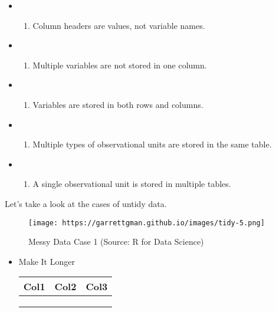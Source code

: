 \documentclass[
]{book}
\providecommand{\tightlist}{%
  \setlength{\itemsep}{0pt}\setlength{\parskip}{0pt}}
\begin{document}
\begin{itemize}
\item
  \begin{enumerate}
  \def\labelenumi{\arabic{enumi}.}
  \tightlist
  \item
    Column headers are values, not variable names.
  \end{enumerate}
\item
  \begin{enumerate}
  \def\labelenumi{\arabic{enumi}.}
  \setcounter{enumi}{1}
  \tightlist
  \item
    Multiple variables are not stored in one column.
  \end{enumerate}
\item
  \begin{enumerate}
  \def\labelenumi{\arabic{enumi}.}
  \setcounter{enumi}{2}
  \tightlist
  \item
    Variables are stored in both rows and columns.
  \end{enumerate}
\item
  \begin{enumerate}
  \def\labelenumi{\arabic{enumi}.}
  \setcounter{enumi}{3}
  \tightlist
  \item
    Multiple types of observational units are stored in the same table.
  \end{enumerate}
\item
  \begin{enumerate}
  \def\labelenumi{\arabic{enumi}.}
  \setcounter{enumi}{4}
  \tightlist
  \item
    A single observational unit is stored in multiple tables.
  \end{enumerate}
\end{itemize}

Let's take a look at the cases of untidy data.

\begin{figure}
\centering
\texttt{[image: https://garrettgman.github.io/images/tidy-5.png]}
\caption{Messy Data Case 1 (Source: R for Data Science)}
\end{figure}

\begin{itemize}
\item
  Make It Longer

  \begin{longtable}[]{@{}lll@{}}
  \toprule
  Col1 & Col2 & Col3\tabularnewline
  \midrule
  \endhead
  & &\tabularnewline
  & &\tabularnewline
  & &\tabularnewline
  \bottomrule
  \end{longtable}
\end{itemize}
\end{document}
